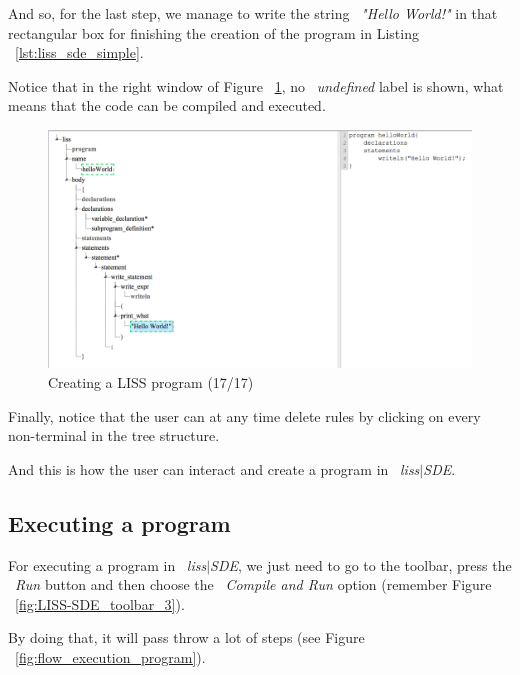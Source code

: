 \documentclass[
  oneside,
  11pt, a4paper,
  footinclude=true,
  headinclude=true,
  cleardoublepage=empty
]{scrbook}
\begin{document}
And so, for the last step, we manage to write the string ~\textit{"Hello World!"} in that rectangular box for finishing the creation of the program in Listing ~\ref{lst:liss_sde_simple}. 

Notice that in the right window of Figure ~\ref{fig:LISS-SDE_example_17}, no ~\textit{undefined} label is shown, what means that the code can be compiled and executed.

\begin{figure}[h!]
  \centering
    \includegraphics[width=1\textwidth]{img/LISS-SDE_creating_program/LISS-SDE17.png}
    \caption{Creating a LISS program (17/17)}
    \label{fig:LISS-SDE_example_17}
\end{figure}

Finally, notice that the user can at any time delete rules by clicking on every non-terminal in the tree structure.

And this is how the user can interact and create a program in ~\textit{liss$|$SDE}.

\newpage

\subsection{Executing a program}

For executing a program in ~\textit{liss$|$SDE}, we just need to go to the toolbar, press the ~\textit{Run} button and then choose the ~\textit{Compile and Run} option (remember Figure ~\ref{fig:LISS-SDE_toolbar_3}).

By doing that, it will pass throw a lot of steps (see Figure ~\ref{fig:flow_execution_program}).
\end{document}
